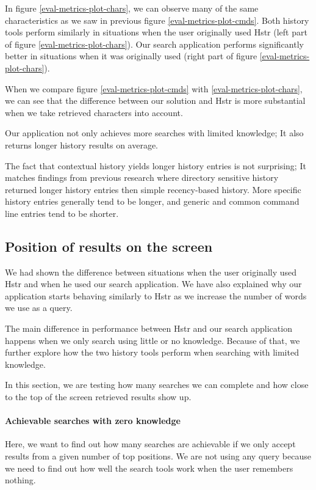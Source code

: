 In figure \ref{eval-metrics-plot-chars}, we can observe many of the same characteristics as we saw in previous figure \ref{eval-metrics-plot-cmds}. Both history tools perform similarly in situations when the user originally used Hstr (left part of figure \ref{eval-metrics-plot-chars}). Our search application performs significantly better in situations when it was originally used (right part of figure \ref{eval-metrics-plot-chars}). 

When we compare figure \ref{eval-metrics-plot-cmds} with \ref{eval-metrics-plot-chars}, we can see that the difference between our solution and Hstr is more substantial when we take retrieved characters into account. 

Our application not only achieves more searches with limited knowledge; It also returns longer history results on average.

The fact that contextual history yields longer history entries is not surprising; It matches findings from previous research\cite{greenberg1993computer} where directory sensitive history returned longer history entries then simple recency-based history. More specific history entries generally tend to be longer, and generic and common command line entries tend to be shorter. 


\subsection{Position of results on the screen}

We had shown the difference between situations when the user originally used Hstr and when he used our search application. We have also explained why our application starts behaving similarly to Hstr as we increase the number of words we use as a query.

The main difference in performance between Hstr and our search application happens when we only search using little or no knowledge. Because of that, we further explore how the two history tools perform when searching with limited knowledge.

In this section, we are testing how many searches we can complete and how close to the top of the screen retrieved results show up. 

\paragraph{Achievable searches with zero knowledge}

Here, we want to find out how many searches are achievable if we only accept results from a given number of top positions. We are not using any query because we need to find out how well the search tools work when the user remembers nothing.

